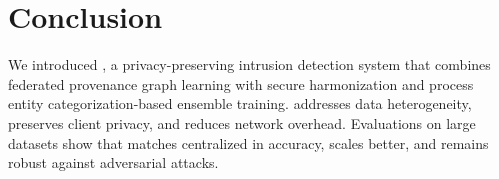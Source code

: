 \section{Conclusion}
\label{sec:conclusion}

We introduced \Sys, a privacy-preserving intrusion detection system that combines federated provenance graph learning with secure \wordvec harmonization and process entity categorization-based \gnnshort ensemble training. \Sys addresses data heterogeneity, preserves client privacy, and reduces network overhead. Evaluations on large datasets show that \Sys matches centralized \pids in accuracy, scales better, and remains robust against adversarial attacks. %